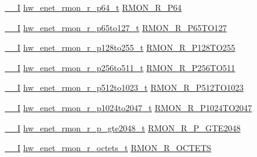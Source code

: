\begin{DoxyCompactItemize}
\item 
\hyperlink{core__sc300_8h_af63697ed9952cc71e1225efe205f6cd3}{\+\_\+\+\_\+I} \hyperlink{union__hw__enet__rmon__r__p64}{hw\+\_\+enet\+\_\+rmon\+\_\+r\+\_\+p64\+\_\+t} \hyperlink{struct__hw__enet_a719582f3b4e18caba117faa9793112ba}{R\+M\+O\+N\+\_\+\+R\+\_\+\+P64}
\item 
\hyperlink{core__sc300_8h_af63697ed9952cc71e1225efe205f6cd3}{\+\_\+\+\_\+I} \hyperlink{union__hw__enet__rmon__r__p65to127}{hw\+\_\+enet\+\_\+rmon\+\_\+r\+\_\+p65to127\+\_\+t} \hyperlink{struct__hw__enet_a94fefd092de0014101c112ba52ccaa0d}{R\+M\+O\+N\+\_\+\+R\+\_\+\+P65\+T\+O127}
\item 
\hyperlink{core__sc300_8h_af63697ed9952cc71e1225efe205f6cd3}{\+\_\+\+\_\+I} \hyperlink{union__hw__enet__rmon__r__p128to255}{hw\+\_\+enet\+\_\+rmon\+\_\+r\+\_\+p128to255\+\_\+t} \hyperlink{struct__hw__enet_a6483b9379bb121d7983a9dccc4b28b09}{R\+M\+O\+N\+\_\+\+R\+\_\+\+P128\+T\+O255}
\item 
\hyperlink{core__sc300_8h_af63697ed9952cc71e1225efe205f6cd3}{\+\_\+\+\_\+I} \hyperlink{union__hw__enet__rmon__r__p256to511}{hw\+\_\+enet\+\_\+rmon\+\_\+r\+\_\+p256to511\+\_\+t} \hyperlink{struct__hw__enet_a59cbd125e4ae1e21596d57235498deb6}{R\+M\+O\+N\+\_\+\+R\+\_\+\+P256\+T\+O511}
\item 
\hyperlink{core__sc300_8h_af63697ed9952cc71e1225efe205f6cd3}{\+\_\+\+\_\+I} \hyperlink{union__hw__enet__rmon__r__p512to1023}{hw\+\_\+enet\+\_\+rmon\+\_\+r\+\_\+p512to1023\+\_\+t} \hyperlink{struct__hw__enet_a1ba910cc1cd2a50e38d145b7e7ed7e0d}{R\+M\+O\+N\+\_\+\+R\+\_\+\+P512\+T\+O1023}
\item 
\hyperlink{core__sc300_8h_af63697ed9952cc71e1225efe205f6cd3}{\+\_\+\+\_\+I} \hyperlink{union__hw__enet__rmon__r__p1024to2047}{hw\+\_\+enet\+\_\+rmon\+\_\+r\+\_\+p1024to2047\+\_\+t} \hyperlink{struct__hw__enet_a14ad35d237bd71cfbea4e9575649729e}{R\+M\+O\+N\+\_\+\+R\+\_\+\+P1024\+T\+O2047}
\item 
\hyperlink{core__sc300_8h_af63697ed9952cc71e1225efe205f6cd3}{\+\_\+\+\_\+I} \hyperlink{union__hw__enet__rmon__r__p__gte2048}{hw\+\_\+enet\+\_\+rmon\+\_\+r\+\_\+p\+\_\+gte2048\+\_\+t} \hyperlink{struct__hw__enet_a4e09306c0ee1ab4050e2091d1f6e4e51}{R\+M\+O\+N\+\_\+\+R\+\_\+\+P\+\_\+\+G\+T\+E2048}
\item 
\hyperlink{core__sc300_8h_af63697ed9952cc71e1225efe205f6cd3}{\+\_\+\+\_\+I} \hyperlink{union__hw__enet__rmon__r__octets}{hw\+\_\+enet\+\_\+rmon\+\_\+r\+\_\+octets\+\_\+t} \hyperlink{struct__hw__enet_a68bba26efd7a635e8257fd916c9ec7e9}{R\+M\+O\+N\+\_\+\+R\+\_\+\+O\+C\+T\+E\+TS}

\end{DoxyCompactItemize}
